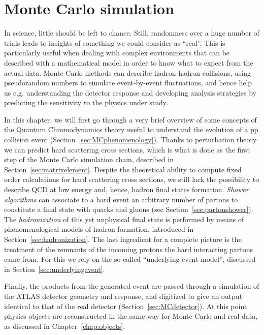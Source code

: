 \clearpage{\pagestyle{empty}\cleardoublepage}

\chapter{Monte Carlo simulation}\label{chap:mc}

In science, little should be left to chance. Still, randomness
over a huge number of trials leads to insights of something we could
consider as ``real''. This is particularly useful when dealing with 
complex environments that can be described with a mathematical model
in order to know what to expect from the actual data.
Monte Carlo methods can describe hadron-hadron collisions,
using pseudorandom numbers to simulate event-by-event fluctuations, and
hence help us e.g. understanding the detector response and developing analysis
strategies by predicting the sensitivity to the physics under study.

In this chapter, we will first go through a very brief overview of some concepts of the 
Quantum Chromodynamics theory useful to understand the evolution of a pp collision
event (Section~\ref{sec:MCphenomenology}). Thanks to perturbation theory we can predict hard 
scattering cross sections, which is what is done as the first step of the Monte Carlo 
simulation chain, described in Section~\ref{sec:matrixelement}.
Despite the theoretical ability to compute fixed order calculations for hard scattering cross sections,
we still lack the possibility to describe QCD at low energy and, hence, hadron final states formation. 
{\it Shower algorithms} can associate to a hard event an arbitrary number of partons to constitute
a final state with quarks and gluons (see Section~\ref{sec:partonshower}). 
The {\it hadronization} of this yet unphysical final state is
performed by means of phenomenological models of hadron formation, introduced in Section~\ref{sec:hadronization}. 
The last ingredient for a complete picture is the treatment of
the remnants of the incoming protons the hard interacting partons
came from. For this we rely on the so-called ``underlying event model'', discussed in 
Section~\ref{sec:underlyingevent}.

Finally, the products from the generated event are passed through a simulation of the ATLAS
detector geometry and response, and digitized to give an output identical to 
that of the real detector (Section~\ref{sec:MCdetector}).
At this point physics objects are reconstructed in the same way for Monte Carlo
and real data, as discussed in Chapter~\ref{chap:objects}.
 

